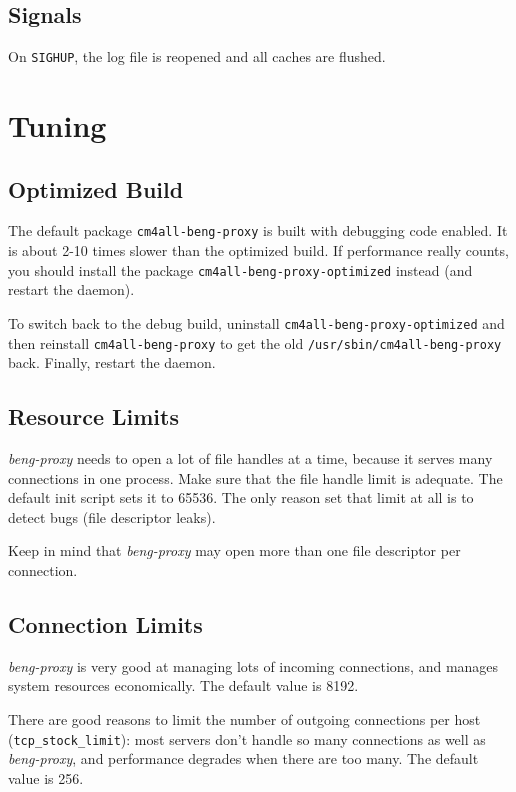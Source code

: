 \documentclass[a4paper,12pt]{article}
\begin{document}
\subsection{Signals}

On \texttt{SIGHUP}, the log file is reopened and all caches are
flushed.


\section{Tuning}

\subsection{Optimized Build}

The default package \texttt{cm4all-beng-proxy} is built with debugging
code enabled.  It is about 2-10 times slower than the optimized build.
If performance really counts, you should install the package
\texttt{cm4all\--beng\--proxy\--optimized} instead (and restart the
daemon).

To switch back to the debug build, uninstall
\texttt{cm4all\--beng\--proxy\--op\-ti\-mi\-zed} and then reinstall
\texttt{cm4all\--beng\--proxy} to get the old
\texttt{/usr/sbin/cm4all\--beng\--proxy} back.  Finally, restart the
daemon.

\subsection{Resource Limits}

\emph{beng-proxy} needs to open a lot of file handles at a time,
because it serves many connections in one process.  Make sure that the
file handle limit is adequate.  The default init script sets it to
65536.  The only reason set that limit at all is to detect bugs (file
descriptor leaks).

Keep in mind that \emph{beng-proxy} may open more than one file
descriptor per connection.

\subsection{Connection Limits}

\emph{beng-proxy} is very good at managing lots of incoming
connections, and manages system resources economically.  The default
value is 8192.

There are good reasons to limit the number of outgoing connections per
host (\texttt{tcp\_stock\_limit}): most servers don't handle so many
connections as well as \emph{beng-proxy}, and performance degrades
when there are too many.  The default value is 256.
\end{document}
